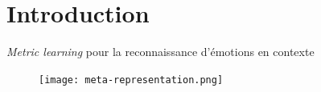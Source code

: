 \documentclass[11pt,aspectratio=169]{beamer}
\begin{document}
\begin{frame}[plain]
\end{frame}

\section{Introduction}

\begin{frame}{\textsl{Metric learning} pour la reconnaissance d'émotions en contexte}

    \begin{figure}
        \centering
        \texttt{[image: meta-representation.png]}
    \end{figure}
    
\end{frame}
\end{document}

